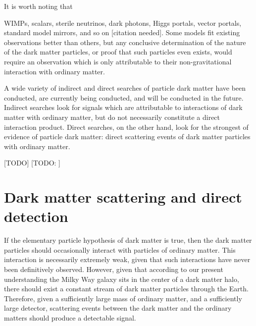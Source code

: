 \documentclass[b5paper, 10pt, twoside]{book}
\newcommand{\typographersred}{scp-red-dark-3}
\newcommand{\needcite}{\textcolor{\typographersred}{[citation needed]}}
\newcommand{\todo}[1][]{%
   \ifthenelse{ \equal{#1}{} }
      {\textcolor{\typographersred}{[TODO]}}
      {\textcolor{\typographersred}{[TODO: #1]}}
}
\begin{document}
It is worth noting that 

WIMPs, scalars, sterile neutrinos, dark photons, Higgs portals, vector portals, standard model mirrors, and so on \needcite. Some models fit existing observations better than others, but any conclusive determination of the nature of the dark matter particles, or proof that such particles even exists, would require an observation which is only attributable to their non-gravitational interaction with ordinary matter.

A wide variety of indirect and direct searches of particle dark matter have been conducted, are currently being conducted, and will be conducted in the future. Indirect searches look for signals which are attributable to interactions of dark matter with ordinary matter, but do not necessarily constitute a direct interaction product. Direct searches, on the other hand, look for the strongest of evidence of particle dark matter: direct scattering events of dark matter particles with ordinary matter.

\todo

\chapter{Dark matter scattering and direct detection}
\label{chap:direct-detection}

If the elementary particle hypothesis of dark matter is true, then the dark matter particles should occasionally interact with particles of ordinary matter. This interaction is necessarily extremely weak, given that such interactions have never been definitively observed. However, given that according to our present understanding the Milky Way galaxy sits in the center of a dark matter halo, there should exist a constant stream of dark matter particles through the Earth. Therefore, given a sufficiently large mass of ordinary matter, and a sufficiently large detector, scattering events between the dark matter and the ordinary matters should produce a detectable signal.
\end{document}
